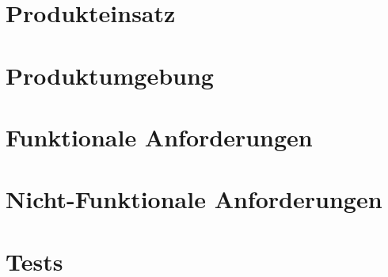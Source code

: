 \documentclass[parskip=full,11pt,twoside]{scrartcl}
\begin{document}


\pagebreak
\section{Produkteinsatz}


\section{Produktumgebung}


\section{Funktionale Anforderungen}





\section{Nicht-Funktionale Anforderungen}





\section{Tests}



\end{document}

